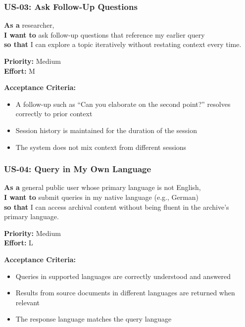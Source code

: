 \documentclass[
  11pt,
]{article}
\providecommand{\tightlist}{%
  \setlength{\itemsep}{0pt}\setlength{\parskip}{0pt}}
\begin{document}
\subsubsection{US-03: Ask Follow-Up
Questions}\label{us-03-ask-follow-up-questions}

\textbf{As a} researcher,\\
\textbf{I want to} ask follow-up questions that reference my earlier
query\\
\textbf{so that} I can explore a topic iteratively without restating
context every time.

\textbf{Priority:} Medium\\
\textbf{Effort:} M

\textbf{Acceptance Criteria:}

\begin{itemize}
\tightlist
\item
  A follow-up such as ``Can you elaborate on the second point?''
  resolves correctly to prior context
\item
  Session history is maintained for the duration of the session
\item
  The system does not mix context from different sessions
\end{itemize}

\subsubsection{US-04: Query in My Own
Language}\label{us-04-query-in-my-own-language}

\textbf{As a} general public user whose primary language is not
English,\\
\textbf{I want to} submit queries in my native language (e.g., German)\\
\textbf{so that} I can access archival content without being fluent in
the archive's primary language.

\textbf{Priority:} Medium\\
\textbf{Effort:} L

\textbf{Acceptance Criteria:}

\begin{itemize}
\tightlist
\item
  Queries in supported languages are correctly understood and answered
\item
  Results from source documents in different languages are returned when
  relevant
\item
  The response language matches the query language
\end{itemize}
\end{document}
